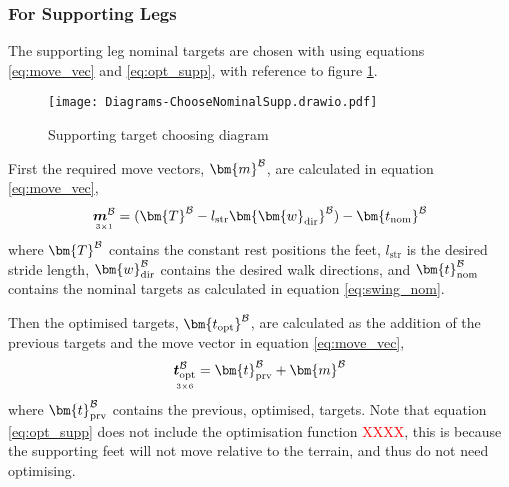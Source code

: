             \subsubsection{For Supporting Legs} \label{sec:support}
                The supporting leg nominal targets are chosen with using equations \ref{eq:move_vec} and \ref{eq:opt_supp}, with reference
                to figure \ref{fig:supp_targ}.
                \begin{figure}[h]
                    \centering
                    \texttt{[image: Diagrams-ChooseNominalSupp.drawio.pdf]}
                    \caption{Supporting target choosing diagram} 
                    \label{fig:supp_targ}
                \end{figure}

                \noindent
                First the required move vectors, \(\bm{m} ^\fbody\), are calculated in equation \ref{eq:move_vec},
                \begin{equation}\label{eq:move_vec}
                    \mdim{\boldsymbol{m}^\fbody}{3}{1} =  (\bm{T}^\fbody - l_\text{str} \bm{\bm{w}_\text{dir}}^\fbody) - \bm{t_\text{nom}}^\fbody
                \end{equation}
                where \(\bm{T}^\fbody\) contains the constant rest positions the feet, \(l_\text{str}\) is the desired stride length, \(\bm{w}_\text{dir}^\fbody\)
                contains the desired walk directions, and \(\bm{t}_\text{nom} ^\fbody\) contains the nominal targets as calculated in
                equation \ref{eq:swing_nom}.

                Then the optimised targets, \(\bm{t_\text{opt}} ^\fbody\), are calculated as the addition of the previous targets and the move vector in equation \ref{eq:move_vec},
                \begin{equation} \label{eq:opt_supp}
                    \mdim{\boldsymbol{t}_\text{opt}^\fbody}{3}{6} = \bm{t}_\text{prv}^\fbody + \bm{m}^\fbody
                \end{equation}
                where \(\bm{t}_\text{prv}^\fbody\) contains the previous, optimised, targets. Note that equation \ref{eq:opt_supp} does not include the optimisation
                function \textcolor{red}{XXXX}, this is because the supporting feet will not move relative to the terrain, and thus do not need optimising.

            \newpage
